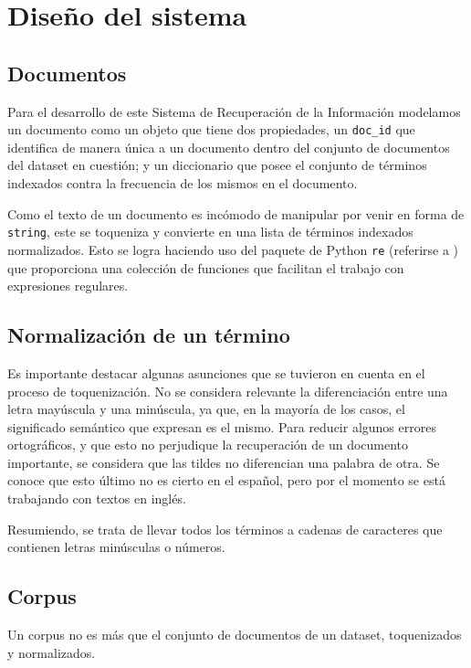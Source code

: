 \documentclass{llncs}
\begin{document}
	\section{Dise\~no del sistema}
	
	\subsection{Documentos}
	Para el desarrollo de este Sistema de Recuperaci\'on de la Informaci\'on modelamos un documento como un objeto que tiene dos propiedades, un \texttt{doc\_id} que identifica de manera \'unica a un documento dentro del conjunto de documentos del dataset en cuesti\'on; y un diccionario que posee el conjunto de términos indexados contra la frecuencia de los mismos en el documento.
	
	Como el texto de un documento es inc\'omodo de manipular por venir en forma de \texttt{string}, este se toqueniza y convierte en una lista de t\'erminos indexados normalizados. Esto se logra haciendo uso del paquete de Python \texttt{re} (referirse a \cite{B4}) que proporciona una colecci\'on de funciones que facilitan el trabajo con expresiones regulares. 
	
	\subsection{Normalizaci\'on de un t\'ermino}
	
	Es importante destacar algunas asunciones que se tuvieron en cuenta en el proceso de toquenizaci\'on. No se considera relevante la diferenciación entre una letra may\'uscula y una min\'uscula, ya que, en la mayoría de los casos, el significado sem\'antico que expresan es el mismo. Para reducir algunos errores ortográficos, y que esto no perjudique la recuperaci\'on de un documento importante, se considera que las tildes no diferencian una palabra de otra. Se conoce que esto \'ultimo no es cierto en el español, pero por el momento se est\'a trabajando con textos en ingl\'es.
	
	Resumiendo, se trata de llevar todos los t\'erminos a cadenas de caracteres que contienen letras min\'usculas o n\'umeros.
	
	\subsection{Corpus}
	
	Un corpus no es más que el conjunto de documentos de un dataset, toquenizados y normalizados.
	
\end{document}
